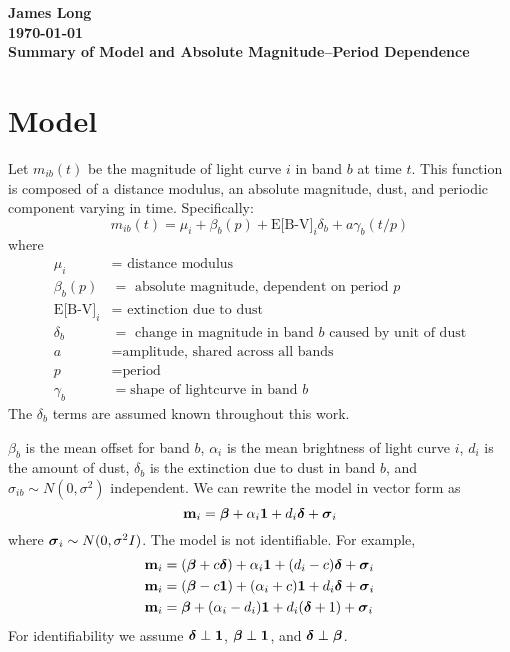 \documentclass[12pt]{article}
\title{}
\date{}
\author{}
\newcommand{\V}[1]{{\bm{\mathbf{\MakeLowercase{#1}}}}} %
\begin{document}
\noindent
\textbf{James Long}\\
\textbf{\today}\\
\textbf{Summary of Model and Absolute Magnitude--Period Dependence}


\section{Model}

Let $m_{ib}(t)$ be the magnitude of light curve $i$ in band $b$ at time $t$. This function is composed of a distance modulus, an absolute magnitude, dust, and periodic component varying in time. Specifically:
\begin{equation*}
m_{ib}(t) = \mu_i + \beta_{b}(p) + \text{E[B-V]}_i\delta_b + a\gamma_b(t/p)
\end{equation*}
where
\begin{align*}
  \mu_i &= \text{ distance modulus }\\
  \beta_{b}(p) &= \text{ absolute magnitude, dependent on period } p\\
  \text{E[B-V]}_i &= \text{ extinction due to dust }\\
  \delta_b &= \text{ change in magnitude in band $b$ caused by unit of dust}\\
  a &= \text{amplitude, shared across all bands}\\
  p &= \text{period}\\
  \gamma_b &= \text{shape of lightcurve in band $b$}
\end{align*}
The $\delta_b$ terms are assumed known throughout this work. 


$\beta_b$ is the mean offset for band $b$, $\alpha_i$ is the mean brightness of light curve $i$, $d_i$ is the amount of dust, $\delta_b$ is the extinction due to dust in band $b$, and $\sigma_{ib} \sim N(0,\sigma^2)$ independent. We can rewrite the model in vector form as
\begin{equation*}
\V{m}_i = \V{\beta} + \alpha_i \V{1} + d_i \V{\delta} + \V{\sigma}_i
\end{equation*}
where $\V{\sigma}_i \sim N(0,\sigma^2I)$. The model is not identifiable. For example,
\begin{align*}
\V{m}_i &= (\V{\beta} + c\V{\delta}) + \alpha_i \V{1} + (d_i - c) \V{\delta} + \V{\sigma}_i\\
\V{m}_i &= (\V{\beta} - c\V{1}) + (\alpha_i + c)\V{1} + d_i\V{\delta} + \V{\sigma}_i\\
\V{m}_i &= \V{\beta} + (\alpha_i - d_i)\V{1} + d_i(\V{\delta} + 1) + \V{\sigma}_i\\
\end{align*}
For identifiability we assume $\V{\delta} \perp \V{1}$, $\V{\beta} \perp \V{1}$, and $\V{\delta} \perp \V{\beta}$.



%
%
\end{document}
